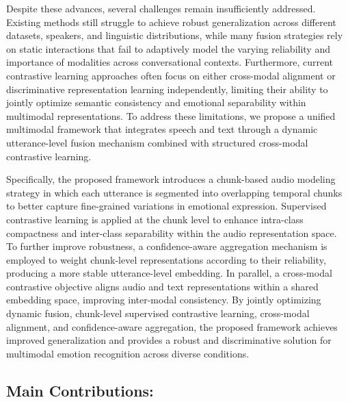 Despite these advances, several challenges remain insufficiently addressed. Existing methods still struggle to achieve robust generalization across different datasets, speakers, and linguistic distributions, while many fusion strategies rely on static interactions that fail to adaptively model the varying reliability and importance of modalities across conversational contexts. Furthermore, current contrastive learning approaches often focus on either cross-modal alignment or discriminative representation learning independently, limiting their ability to jointly optimize semantic consistency and emotional separability within multimodal representations. To address these limitations, we propose a unified multimodal framework that integrates speech and text through a dynamic utterance-level fusion mechanism combined with structured cross-modal contrastive learning.

Specifically, the proposed framework introduces a chunk-based audio modeling strategy in which each utterance is segmented into overlapping temporal chunks to better capture fine-grained variations in emotional expression. Supervised contrastive learning is applied at the chunk level to enhance intra-class compactness and inter-class separability within the audio representation space. To further improve robustness, a confidence-aware aggregation mechanism is employed to weight chunk-level representations according to their reliability, producing a more stable utterance-level embedding. In parallel, a cross-modal contrastive objective aligns audio and text representations within a shared embedding space, improving inter-modal consistency. By jointly optimizing dynamic fusion, chunk-level supervised contrastive learning, cross-modal alignment, and confidence-aware aggregation, the proposed framework achieves improved generalization and provides a robust and discriminative solution for multimodal emotion recognition across diverse conditions.

\subsection*{Main Contributions:}

